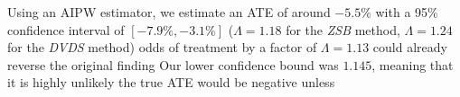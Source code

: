 Using an AIPW estimator, we estimate an ATE of around $-5.5\%$ with a 95\% confidence interval of $[-7.9\%, -3.1\%]$
($\Lambda = 1.18$ for the \textit{ZSB} method, $\Lambda = 1.24$ for the \textit{DVDS} method)
odds of treatment by a factor of $\Lambda = 1.13$ could already reverse the original finding
Our lower confidence bound was $1.145$, meaning that it is highly unlikely the true ATE would be negative unless
